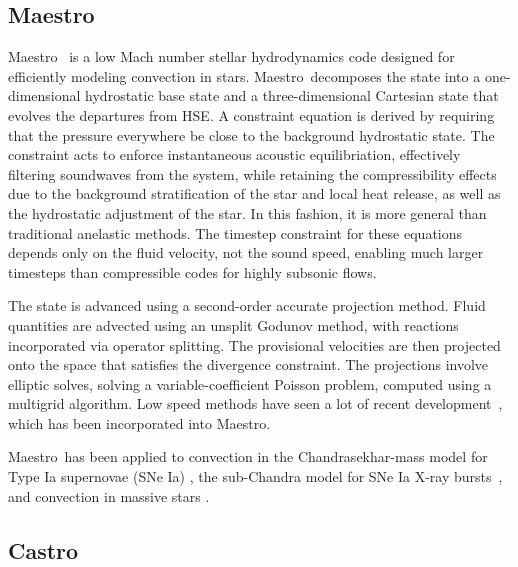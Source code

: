 \documentclass[a4paper]{jpconf}
\newcommand{\maestro}{{\sffamily Maestro}}
\newcommand{\castro}{{\sffamily Castro}}
\begin{document}
\subsection{\maestro}

\maestro~\cite{MAESTRO:Multilevel} is a low Mach number stellar
hydrodynamics code designed for efficiently modeling convection in
stars.  \maestro\ decomposes the state into a one-dimensional
hydrostatic base state and a three-dimensional Cartesian state that
evolves the departures from HSE.  A constraint equation is derived by
requiring that the pressure everywhere be close to the background
hydrostatic state.  The constraint acts to enforce instantaneous
acoustic equilibriation, effectively filtering soundwaves from the
system, while retaining the compressibility effects due to the
background stratification of the star and local heat release, as well
as the hydrostatic adjustment of the star.  In this fashion, it is
more general than traditional anelastic methods.  The timestep
constraint for these equations depends only on the fluid velocity, not
the sound speed, enabling much larger timesteps than compressible
codes for highly subsonic flows.

The state is advanced using a second-order accurate projection method.
Fluid quantities are advected using an unsplit Godunov method, with
reactions incorporated via operator splitting.  The provisional
velocities are then projected onto the space that satisfies the
divergence constraint.  The projections involve elliptic solves,
solving a variable-coefficient Poisson problem, computed using a
multigrid algorithm.  Low speed methods have seen a lot of recent
development~\cite{kleinpauluis,vasil:2013}, which has been
incorporated into \maestro.

\maestro\ has been applied to convection in the Chandrasekhar-mass
model for Type Ia supernovae (SNe Ia)
\cite{ZABNW:IV,wdconvect,wdturb}, the sub-Chandra model for SNe Ia
\cite{subchandra,subchandra2} X-ray bursts~\cite{xrb,xrb2,xrb3}, and
convection in massive stars \cite{ms_cc}.





\subsection{\castro}
\end{document}
